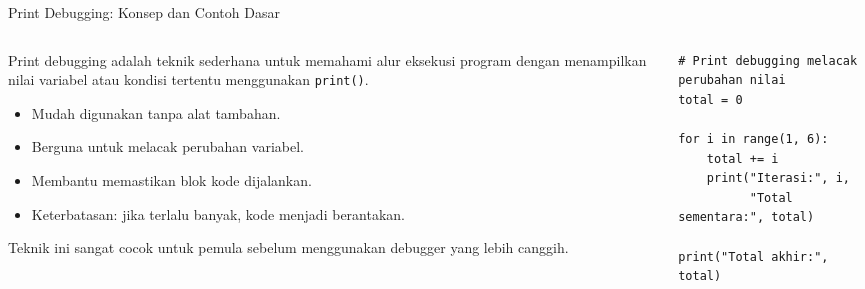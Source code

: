 \documentclass[aspectratio=169, table]{beamer}
\begin{document}
\begin{frame}[fragile]{Print Debugging: Konsep dan Contoh Dasar}
\vspace{20pt}

\begin{columns}[T]
    \begin{column}{0.6\linewidth}
        Print debugging adalah teknik sederhana untuk memahami
        alur eksekusi program dengan menampilkan nilai variabel
        atau kondisi tertentu menggunakan \texttt{print()}.

        \begin{itemize}
            \item Mudah digunakan tanpa alat tambahan.
            \item Berguna untuk melacak perubahan variabel.
            \item Membantu memastikan blok kode dijalankan.
            \item Keterbatasan: jika terlalu banyak, kode menjadi berantakan.
        \end{itemize}

        Teknik ini sangat cocok untuk pemula sebelum menggunakan
        debugger yang lebih canggih.
    \end{column}

    \begin{column}{0.35\linewidth}
\begin{lstlisting}[style=PythonStyle, basicstyle=\ttfamily\scriptsize]
# Print debugging melacak perubahan nilai
total = 0

for i in range(1, 6):
    total += i
    print("Iterasi:", i,
          "Total sementara:", total)

print("Total akhir:", total)
\end{lstlisting}
    \end{column}
\end{columns}

\end{frame}

\end{document}
